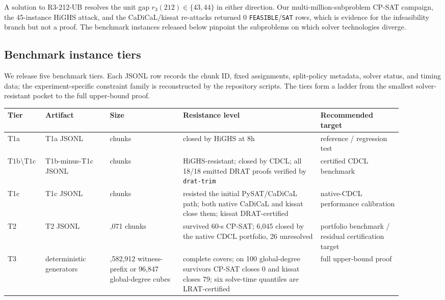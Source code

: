 A solution to R3-212-UB resolves the unit gap $r_3(212)\in\{43,44\}$
in either direction. Our multi-million-subproblem CP-SAT campaign, the
45-instance HiGHS attack, and the CaDiCaL/kissat re-attacks returned 0
\texttt{FEASIBLE}/\texttt{SAT} rows, which is evidence for the
infeasibility branch but not a proof. The benchmark instances released
below pinpoint the subproblems on which solver technologies diverge.

\subsection{Benchmark instance tiers}\label{benchmark-instance-tiers}

We release five benchmark tiers. Each JSONL row records the chunk ID,
fixed assignments, split-policy metadata, solver status, and timing data; the
experiment-specific constraint family is reconstructed by the repository
scripts. The tiers form a ladder
from the smallest solver-resistant pocket to the full upper-bound proof.

{\footnotesize\setlength{\tabcolsep}{3pt} %
\begin{longtable}[]{@{}
  >{\raggedright\arraybackslash}p{0.07\linewidth}
  >{\raggedright\arraybackslash}p{0.15\linewidth}
  >{\raggedright\arraybackslash}p{0.17\linewidth}
  >{\raggedright\arraybackslash}p{0.32\linewidth}
  >{\raggedright\arraybackslash}p{0.19\linewidth}@{}}
\toprule\noalign{}
Tier & Artifact & Size & Resistance level & Recommended target \\
\midrule\noalign{}
\endhead
\bottomrule\noalign{}
\endlastfoot
T1a & T1a JSONL & 25 chunks & closed by HiGHS at 8h & reference / regression test \\
$\mathrm{T1b}\setminus\mathrm{T1c}$ & T1b-minus-T1c JSONL & 18 chunks & HiGHS-resistant; closed by CDCL; all 18/18 emitted DRAT proofs verified by \texttt{drat-trim} & certified CDCL benchmark \\
T1c & T1c JSONL & 2 chunks & resisted the initial PySAT/CaDiCaL path; both native CaDiCaL and kissat close them; kissat DRAT-certified & native-CDCL performance calibration \\
T2 & T2 JSONL & 6,071 chunks & survived 60-s CP-SAT; 6,045 closed by the native CDCL portfolio, 26 unresolved & portfolio benchmark / residual certification target \\
T3 & deterministic generators & 12,582,912 witness-prefix or 96,847 global-degree cubes & complete covers; on 100 global-degree survivors CP-SAT closes 0 and kissat closes 79; six solve-time quantiles are LRAT-certified & full upper-bound proof \\
\end{longtable}
}

